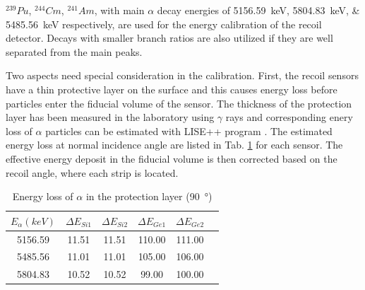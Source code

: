 \documentclass[number,5p]{elsarticle}
\begin{document}
\(^{239}Pu\), \(^{244}Cm\), \(^{241}Am\), with main $\alpha$ decay energies
of \SIlist{5156.59;5804.83;5485.56}{\keV} \cite{nuclear_data} respectively, are
used for the energy calibration of the recoil detector.
Decays with smaller branch ratios are also utilized if they are well separated from the main peaks.

Two aspects need special consideration in the calibration.
First, the recoil sensors have a thin protective layer on the surface and this
causes energy loss before particles enter the fiducial volume of the sensor.
The thickness of the protection layer has been measured in the laboratory using \(\gamma\) rays \cite{recoil_article}
and corresponding enery loss of $\alpha$ particles can be estimated with
LISE++ program \cite{LISE}.
The estimated energy loss at normal incidence angle are listed in Tab.
\ref{tab:dead_layer} for each sensor.
The effective energy deposit in the fiducial volume is then corrected based on the recoil angle, where each strip is located.

\begin{table}[htbp]
\label{tab:dead_layer}
\caption{Energy loss of $\alpha$ in the protection layer (\SI{90}{\degree})}
\centering
\begin{tabular}{cccccc}
\hline
\(E_{\alpha} (keV)\) & \(\Delta E_{Si1}\) & \(\Delta E_{Si2}\) & \(\Delta E_{Ge1}\) & \(\Delta E_{Ge2}\) \\
\hline
5156.59 & 11.51 & 11.51 & 110.00 & 111.00 \\
5485.56 & 11.01 & 11.01 & 105.00 & 106.00 \\
5804.83 & 10.52 & 10.52 & 99.00  & 100.00 \\
\hline
\end{tabular}
\end{table}
\end{document}
